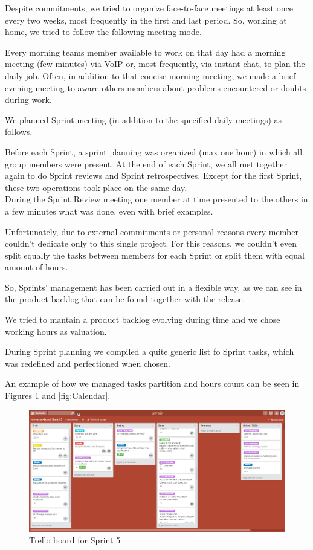 \documentclass[a4paper,12pt]{report}
\begin{document}
Despite commitments, we tried to organize face-to-face meetings at least once every two weeks, most frequently in the first and last period. So, working at home, we tried to follow the following meeting mode.

Every morning teams member available to work on that day had a morning meeting (few minutes) via VoIP or, most frequently, via instant chat, to plan the daily job.
Often, in addition to that concise morning meeting, we made a brief evening meeting to aware others members about problems encountered or doubts during work.

We planned Sprint meeting (in addition to the specified daily meetings) as follows.

Before each Sprint, a sprint planning was organized (max one hour) in which all group members were present. At the end of each Sprint, we all met together again to do Sprint reviews and Sprint retrospectives. Except for the first Sprint, these two operations took place on the same day.\\
During the Sprint Review meeting one member at time presented to the others in a few minutes what was done, even with brief examples.

Unfortunately, due to external commitments or personal reasons every member couldn't dedicate only to this single project. For this reasons, we couldn't even split equally the tasks between members for each Sprint or split them with equal amount of hours.

So, Sprints' management has been carried out in a flexible way, 
as we can see in the product backlog that can be found together with the release. 

We tried to mantain a product backlog evolving during time and we chose working hours as valuation.

During Sprint planning we compiled a quite generic list fo Sprint tasks, which was redefined and perfectioned when chosen.

An example of how we managed tasks partition and hours count can be seen in Figures \ref{fig:Trello} and \ref{fig:Calendar}.

\begin{figure}[ht]
\centering
\includegraphics[width=\textwidth]{figures/Trello.png}
\caption{Trello board for Sprint 5}
\label{fig:Trello}
\end{figure}
\end{document}
